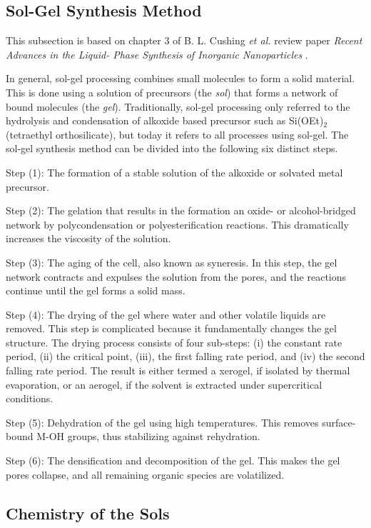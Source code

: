 \subsection{Sol-Gel Synthesis Method}
\noindent This subsection is based on chapter 3 of B. L. Cushing \textit{et al.} review paper \textit{Recent Advances in the Liquid- Phase Synthesis of Inorganic Nanoparticles} \cite{solgel_review}.

In general, sol-gel processing combines small molecules to form a solid material.
This is done using a solution of precursors (the \textit{sol}) that forms a network of bound molecules (the \textit{gel}).
Traditionally, sol-gel processing only referred to the hydrolysis and condensation of alkoxide based precursor such as Si(OEt)$_2$ (tetraethyl orthosilicate), but today it refers to all processes using sol-gel.
The sol-gel synthesis method can be divided into the following six distinct steps.

Step (1): The formation of a stable solution of the alkoxide or solvated metal precursor.

Step (2): The gelation that results in the formation  an oxide- or alcohol-bridged network by polycondensation or polyesterification reactions.
This dramatically increases the viscosity of the solution.

Step (3):  The aging of the cell, also known as syneresis.
In this step, the gel network contracts and expulses the solution from the pores, and the reactions continue until the gel forms a solid mass.

Step (4): The drying of the gel where water and other volatile liquids are removed.
This step is complicated because it fundamentally changes the gel structure.
The drying process consists of four sub-steps: (i) the constant rate period, (ii) the critical point, (iii), the first falling rate period, and (iv) the second falling rate period.
The result is either termed a xerogel, if isolated by thermal evaporation, or an aerogel, if the solvent is extracted under supercritical conditions.

Step (5): Dehydration of the gel using high temperatures.
This removes surface-bound M-OH groups, thus stabilizing against rehydration.

Step (6): The densification and decomposition of the gel.
This makes the gel pores collapse, and all remaining organic species are volatilized.

\subsection{Chemistry of the Sols}

